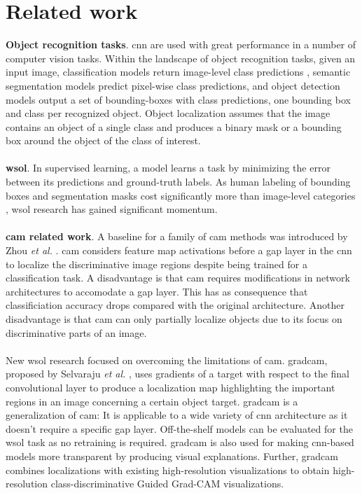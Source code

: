 \chapter{Related work} \label{ch:related_work}
\textbf{Object recognition tasks}. \acrfull{cnn} are used with great performance in a number of computer vision tasks. Within the landscape of object recognition tasks, given an input image, classification models return image-level class predictions \cite{lecun1998gradient}, semantic segmentation models \cite{shelhamer2017fully} predict pixel-wise class predictions, and object detection models \cite{girshick2014rich, girshick2015fast, ren2015faster} output a set of bounding-boxes with class predictions, one bounding box and class per recognized object. Object localization \cite{russakovsky2015imagenet} assumes that the image contains an object of a single class and produces a binary mask or a bounding box around the object of the class of interest.
\\\\
\textbf{\acrshort{wsol}}. In supervised learning, a model learns a task by minimizing the error between its predictions and ground-truth labels. As human labeling of bounding boxes and segmentation masks cost significantly more than image-level categories \cite{papandreou2015weakly}, \acrshort{wsol} research \cite{zhou2016cvpr, zhang2018adversarial, zhang2018self, choe2019attention, singh2017hide} has gained significant momentum. 
\\\\
\textbf{\acrshort{cam} related work}. A baseline for a family of \acrshort{cam} methods was introduced by Zhou \textit{et al.} \cite{zhou2016cvpr}. \acrfull{cam} considers feature map activations before a \acrfull{gap} layer in the \acrshort{cnn} to localize the discriminative image regions despite being trained for a classification task. A disadvantage is that \acrshort{cam} requires modifications in network architectures to accomodate a \acrshort{gap} layer. This has as consequence that classificiation accuracy drops compared with the original architecture. Another disadvantage is that \acrshort{cam} can only partially localize objects due to its focus on discriminative parts of an image. 
\\\\
New \acrshort{wsol} research focused on overcoming the limitations of \acrshort{cam}. \acrfull{gradcam}, proposed by Selvaraju \textit{et al.} \cite{selvaraju2017grad}, uses gradients of a target with respect to the final convolutional layer to produce a localization map highlighting the important regions in an image concerning a certain object target. \acrshort{gradcam} is a generalization of \acrshort{cam}: It is applicable to a wide variety of \acrshort{cnn} architecture as it doesn't require a specific \acrshort{gap} layer. Off-the-shelf models can be evaluated for the \acrshort{wsol} task as no retraining is required. \acrshort{gradcam} is also used for making \acrshort{cnn}-based models more transparent by producing visual explanations. Further, \acrshort{gradcam} combines localizations with existing high-resolution visualizations \cite{springenberg2014striving} to obtain high-resolution class-discriminative Guided Grad-CAM visualizations.
